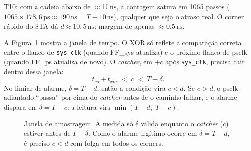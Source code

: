 \documentclass[11pt,a4paper]{article}
\newcommand{\campo}[1]{\vspace{5pt}\noindent{\bfseries\color{lescgray}#1}\par\vspace{1pt}}
\newcommand{\ps}{\ensuremath{\,\mathrm{ps}}\xspace}
\newcommand{\ns}{\ensuremath{\,\mathrm{ns}}\xspace}
\begin{document}
\campo{Evidência}
T10: com a cadeia abaixo de $\approx$10\ns, a contagem satura em 1065 passos
($1065 \times 178{,}6\ps \approx 190\ns = T - 10\ns$), qualquer que seja o atraso real. O corner
rápido do STA dá $d \approx 10{,}5\ns$: margem de apenas $\approx$0{,}5\ns.

\campo{Por que acontece}
A Figura~\ref{fig:janela} mostra a janela de tempo. O XOR só reflete a comparação correta
entre o flanco de \texttt{sys\_clk} (quando FF\_sys atualiza) e o próximo flanco de psclk
(quando FF\_ps atualiza de novo). O \emph{catcher}, em $+c$ após \texttt{sys\_clk}, precisa cair
dentro dessa janela:
\[
  t_{co} + t_{xor} \;<\; c \;<\; T - \delta .
\]
No limiar de alarme, $\delta = T - d$, então a condição vira $c < d$. Se $c > d$, o psclk
adiantado ``passa'' por cima do \emph{catcher} antes de o caminho falhar, e o alarme dispara em
$\delta = T - c$: a leitura vira $\min(T-d,\;T-c)$.

\begin{figure}[H]
\centering
{}
\caption{Janela de amostragem. A medida só é válida enquanto o \emph{catcher} ($c$) estiver
antes de $T-\delta$. Como o alarme legítimo ocorre em $\delta = T-d$, é preciso $c < d$ com folga
em todos os corners.}
\label{fig:janela}
\end{figure}
\end{document}
